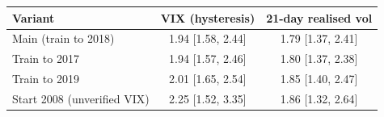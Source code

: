 \begin{tabular}{lcc}
\toprule
Variant & VIX (hysteresis) & 21-day realised vol \\
\midrule
Main (train to 2018) & 1.94 [1.58, 2.44] & 1.79 [1.37, 2.41] \\
Train to 2017 & 1.94 [1.57, 2.46] & 1.80 [1.37, 2.38] \\
Train to 2019 & 2.01 [1.65, 2.54] & 1.85 [1.40, 2.47] \\
Start 2008 (unverified VIX) & 2.25 [1.52, 3.35] & 1.86 [1.32, 2.64] \\
\bottomrule
\end{tabular}
